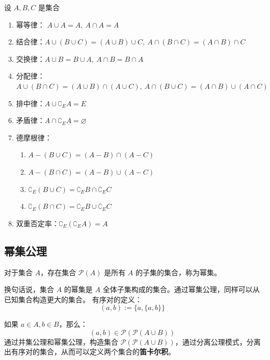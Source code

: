 \begin{theorem}[集合常用算律]
    设 $A,B,C$ 是集合
    \begin{enumerate}
        \item 幂等律： $A\cup A = A,\  A\cap A = A$
        \item 结合律：$A\cup (B\cup C) = (A\cup B)\cup C,\ A\cap(B\cap C) = (A\cap B)\cap C$
        \item 交换律：$A\cup B = B\cup A,\ A\cap B = B\cap A$
        \item 分配律：$ A\cup (B\cap C) = (A\cup B)\cap(A\cup C),\ A\cap (B\cup C) = (A\cap B)\cup(A\cap C) $
        \item 排中律：$A\cup \complement_EA = E$
        \item 矛盾律：$A\cap \complement_EA = \varnothing$
        \item 德摩根律：
        \begin{enumerate}
            \item $A-(B\cup C) = (A-B)\cap (A-C)$
            \item $A-(B\cap C) = (A-B)\cup (A-C)$
            \item $\complement_E(B\cup C) = \complement_EB\cap \complement_EC$
            \item $\complement_E(B\cap C) = \complement_EB\cup \complement_EC$
        \end{enumerate}
        \item 双重否定率：$ \complement_E(\complement_E A) = A $
    \end{enumerate}
\end{theorem}

\subsection{幂集公理}

\begin{axiom}
    对于集合 $ A $，存在集合 $ \mathcal{P}(A) $ 是所有 $ A $ 的子集的集合，称为幂集。
\end{axiom}

\begin{note}
    换句话说，集合 $ A $ 的幂集是 $ A $ 全体子集构成的集合。通过幂集公理，同样可以从已知集合构造更大的集合。 有序对的定义：
    \[
        (a,b) := \{a,\{a,b\}\} 
    \]

    如果 $ a\in A,b\in B $，那么：
    \[
        (a,b)\in \mathcal{P}(\mathcal{P}(A\cup B))
    \]
    通过并集公理和幂集公理，构造集合 $ \mathcal{P}(\mathcal{P}(A\cup B)) $，通过分离公理模式，分离出有序对的集合，从而可以定义两个集合的\textbf{笛卡尔积}。
\end{note}


